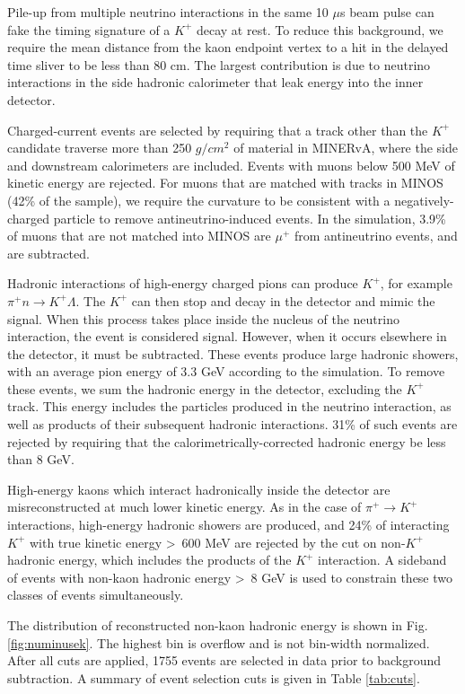 \documentclass[aps,prl,preprint,showpacs,superscriptaddress,nofootinbib,floatfix,linenumbers]{revtex4}
\newcommand{\minerva}{MINERvA\xspace}
\newcommand{\minos}{MINOS\xspace}
\newcommand{\pip}{\ensuremath{\pi^{+}}\xspace}
\newcommand{\kp}{\ensuremath{K^{+}}\xspace}
\newcommand{\mup}{\ensuremath{\mu^{+}}\xspace}
\begin{document}
Pile-up from multiple neutrino interactions in the same 10 $\mu$s beam pulse can fake the timing signature of a \kp decay at rest. To reduce this background, we require the mean distance from the kaon endpoint vertex to a hit in the delayed time sliver to be less than 80 cm. The largest contribution is due to neutrino interactions in the side hadronic calorimeter that leak energy into the inner detector.

Charged-current events are selected by requiring that a track other than the \kp candidate traverse more than 250 $g/cm^{2}$ of material in \minerva, where the side and downstream calorimeters are included. Events with muons below 500 MeV of kinetic energy are rejected. For muons that are matched with tracks in MINOS (42\% of the sample), we require the curvature to be consistent with a negatively-charged particle to remove antineutrino-induced events. In the simulation, 3.9\% of muons that are not matched into \minos are \mup from antineutrino events, and are subtracted.

Hadronic interactions of high-energy charged pions can produce $K^{+}$, for example $\pi^{+} n \rightarrow K^{+} \Lambda$. The \kp can then stop and decay in the detector and mimic the signal. When this process takes place inside the nucleus of the neutrino interaction, the event is considered signal. However, when it occurs elsewhere in the detector, it must be subtracted. These events produce large hadronic showers, with an average pion energy of 3.3 GeV according to the simulation. To remove these events, we sum the hadronic energy in the detector, excluding the \kp track. This energy includes the particles produced in the neutrino interaction, as well as products of their subsequent hadronic interactions. 31\% of such events are rejected by requiring that the calorimetrically-corrected hadronic energy be less than 8 GeV. 

High-energy kaons which interact hadronically inside the detector are misreconstructed at much lower kinetic energy. As in the case of $\pip \rightarrow \kp$ interactions, high-energy hadronic showers are produced, and 24\% of interacting \kp with true kinetic energy \textgreater~600 MeV are rejected by the cut on non-\kp hadronic energy, which includes the products of the \kp interaction. A sideband of events with non-kaon hadronic energy \textgreater~8 GeV is used to constrain these two classes of events simultaneously.

The distribution of reconstructed non-kaon hadronic energy is shown in Fig. \ref{fig:numinusek}. The highest bin is overflow and is not bin-width normalized. After all cuts are applied, 1755 events are selected in data prior to background subtraction. A summary of event selection cuts is given in Table \ref{tab:cuts}.
\end{document}
